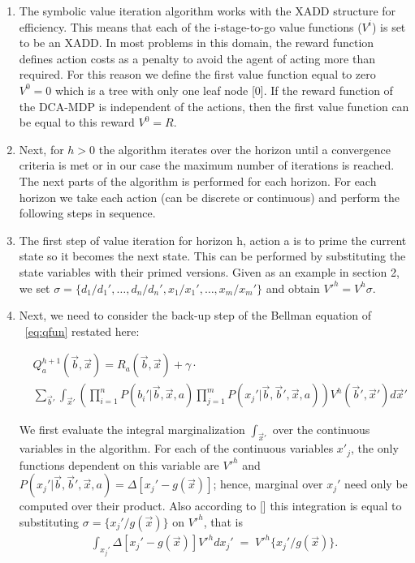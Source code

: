 \documentclass[letterpaper]{article}
\renewcommand{\-}{\text{-}}
\begin{document}
\begin{enumerate}
\item The symbolic value iteration algorithm works with the XADD structure for efficiency. This means that each of the i-stage-to-go value functions ($V^i$) is set to be an XADD. In most problems in this domain, the reward function defines action costs as a penalty to avoid the agent of acting more than required. For this reason we define the first value function equal to zero $V^0=0$ which is a tree with only one leaf node [0]. If the reward function of the DCA-MDP is independent of the actions, then the first value function can be equal to this reward $V^0=R$.\\

\item Next, for $h > 0$ the algorithm iterates over the horizon until a convergence criteria is met or in our case the maximum number of iterations is reached. The next parts of the algorithm is performed for each horizon. For each horizon we take each action (can be discrete or continuous) and perform the following steps in sequence.\\

\item The first step of value iteration for horizon h, action a is to prime the current state so it becomes the next state. This can be performed by substituting the state variables with their primed versions. Given as an example in section 2, we set
$\sigma = \{ d_1 / d_1', \ldots, d_n / d_n', x_1 / x_1', \ldots, x_m / x_m' \}$
and obtain $V'^{h} = V^{h}\sigma$.

\item Next, we need to consider the back-up step of the Bellman equation of ~\eqref{eq:qfun} restated here: 
 \vspace{-3mm}
 
 {\footnotesize
 \begin{align}
 & Q_a^{h+1}(\vec{b},\vec{x}) = R_a(\vec{b},\vec{x}) + \gamma \cdot \label{eq:qfun} \\ 
 & \sum_{\vec{b}'} \int_{\vec{x}'} \left( \prod_{i=1}^n P(b_i'|\vec{b},\vec{x},a) \prod_{j=1}^m P(x_j'|\vec{b},\vec{b}',\vec{x},a) \right) V^h(\vec{b}',\vec{x}') d\vec{x}' \nonumber
 \end{align}}
 
We first evaluate the integral marginalization $\int_{\vec{x}'}$ over the continuous variables in the algorithm. For each of the continuous variables $x'_j$, the only functions dependent on this variable are $V'^{h}$
and $P(x_j'|\vec{b},\vec{b}',\vec{x},a) = \Delta[x_j' - g(\vec{x})]$; 
hence, marginal over $x_j'$ need only be computed over
their product. Also according to [] this integration is equal to substituting $\sigma = \{ x_j' / g(\vec{x}) \}$
on $V'^{h}$, that is
\begin{align}
\int_{x_j'} \Delta[x_j' - g(\vec{x})] V'^{h} dx_j' \; = \; V'^{h} \{x_j' / g(\vec{x}) \} . \label{eq:one_int}
\end{align}


\end{enumerate}
\end{document}
